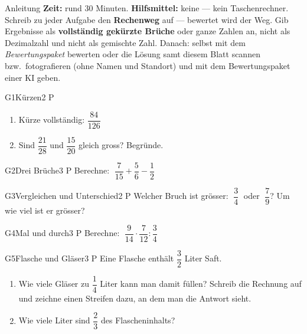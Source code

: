 \documentclass[11pt]{article}
\begin{document}

\begin{lpinfo}{Anleitung}
\textbf{Zeit:} rund 30 Minuten. \textbf{Hilfsmittel:} keine — kein Taschenrechner.
Schreib zu jeder Aufgabe den \textbf{Rechenweg} auf — bewertet wird der Weg. Gib Ergebnisse als
\textbf{vollständig gekürzte Brüche} oder ganze Zahlen an, nicht als Dezimalzahl und nicht als gemischte Zahl.
Danach: selbst mit dem \emph{Bewertungspaket} bewerten oder die Lösung samt diesem Blatt scannen bzw.\ fotografieren
(ohne Namen und Standort) und mit dem Bewertungspaket einer KI geben.
\end{lpinfo}


\begin{lpaufgabe}{G1}{Kürzen}{2 P}
\begin{enumerate}[label=(\alph*),leftmargin=*,itemsep=1pt]
\item Kürze vollständig: $\dfrac{84}{126}$
\item Sind $\dfrac{21}{28}$ und $\dfrac{15}{20}$ gleich gross? Begründe.
\end{enumerate}
\end{lpaufgabe}

\begin{lpaufgabe}{G2}{Drei Brüche}{3 P}
Berechne: $\;\dfrac{7}{15} + \dfrac{5}{6} - \dfrac{1}{2}$
\end{lpaufgabe}

\begin{lpaufgabe}{G3}{Vergleichen und Unterschied}{2 P}
Welcher Bruch ist grösser: $\;\dfrac{3}{4}\;$ oder $\;\dfrac{7}{9}$? Um wie viel ist er grösser?
\end{lpaufgabe}


\begin{lpaufgabe}{G4}{Mal und durch}{3 P}
Berechne: $\;\dfrac{9}{14} \cdot \dfrac{7}{12} : \dfrac{3}{4}$
\end{lpaufgabe}

\begin{lpaufgabe}{G5}{Flasche und Gläser}{3 P}
Eine Flasche enthält $\dfrac{3}{2}$ Liter Saft.
\begin{enumerate}[label=(\alph*),leftmargin=*,itemsep=3pt]
\item Wie viele Gläser zu $\dfrac{1}{4}$ Liter kann man damit füllen? Schreib die Rechnung auf und zeichne
  einen Streifen dazu, an dem man die Antwort sieht.
\item Wie viele Liter sind $\dfrac{2}{3}$ des Flascheninhalts?
\end{enumerate}
\end{lpaufgabe}
\end{document}
